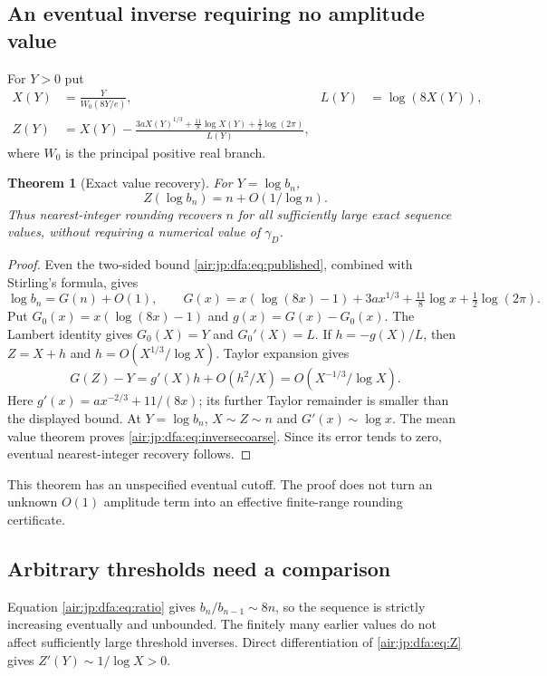 \documentclass[11pt,letterpaper]{article}
\numberwithin{equation}{section}
\newtheorem{theorem}{Theorem}[section]
\theoremstyle{remark}
\begin{document}
\subsection{An eventual inverse requiring no amplitude value}
For $Y>0$ put
\begin{align}
 X(Y)&=\frac{Y}{W_0(8Y/e)},&L(Y)&=\log(8X(Y)),\label{air:jp:dfa:eq:lambert}\\
 Z(Y)&=X(Y)-\frac{3aX(Y)^{1/3}+\frac{11}{8}\log X(Y)+\frac12\log(2\pi)}{L(Y)},\label{air:jp:dfa:eq:Z}
\end{align}
where $W_0$ is the principal positive real branch.

\begin{theorem}[Exact value recovery]\label{air:jp:dfa:thm:inverse}
For $Y=\log b_n$,
\begin{equation}\label{air:jp:dfa:eq:inversecoarse}
 Z(\log b_n)=n+O(1/\log n).
\end{equation}
Thus nearest-integer rounding recovers $n$ for all sufficiently large exact sequence values, without requiring a numerical value of $\gamma_D$.
\end{theorem}
\begin{proof}
Even the two-sided bound \eqref{air:jp:dfa:eq:published}, combined with Stirling's formula, gives
\[
 \log b_n=G(n)+O(1),\qquad
 G(x)=x(\log(8x)-1)+3ax^{1/3}+\tfrac{11}{8}\log x+\tfrac12\log(2\pi).
\]
Put $G_0(x)=x(\log(8x)-1)$ and $g(x)=G(x)-G_0(x)$. The Lambert identity gives $G_0(X)=Y$ and $G_0'(X)=L$. If $h=-g(X)/L$, then $Z=X+h$ and $h=O(X^{1/3}/\log X)$. Taylor expansion gives
\[
 G(Z)-Y=g'(X)h+O(h^2/X)=O(X^{-1/3}/\log X).
\]
Here $g'(x)=ax^{-2/3}+11/(8x)$; its further Taylor remainder is smaller than the displayed bound. At $Y=\log b_n$, $X\sim Z\sim n$ and $G'(x)\sim\log x$. The mean value theorem proves \eqref{air:jp:dfa:eq:inversecoarse}. Since its error tends to zero, eventual nearest-integer recovery follows.
\end{proof}
This theorem has an unspecified eventual cutoff. The proof does not turn an unknown $O(1)$ amplitude term into an effective finite-range rounding certificate.

\subsection{Arbitrary thresholds need a comparison}
Equation \eqref{air:jp:dfa:eq:ratio} gives $b_n/b_{n-1}\sim8n$, so the sequence is strictly increasing eventually and unbounded. The finitely many earlier values do not affect sufficiently large threshold inverses. Direct differentiation of \eqref{air:jp:dfa:eq:Z} gives $Z'(Y)\sim1/\log X>0$.
\end{document}

